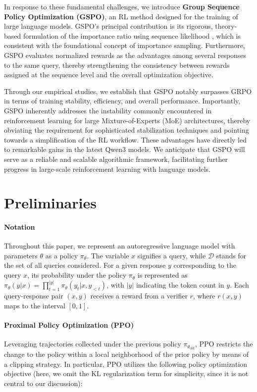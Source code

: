 In response to these fundamental challenges, we introduce \textbf{Group Sequence Policy Optimization (GSPO)}, an RL method designed for the training of large language models. GSPO's principal contribution is its rigorous, theory-based formulation of the importance ratio using sequence likelihood \citep{click}, which is consistent with the foundational concept of importance sampling. Furthermore, GSPO evaluates normalized rewards as the advantages among several responses to the same query, thereby strengthening the consistency between rewards assigned at the sequence level and the overall optimization objective.

Through our empirical studies, we establish that GSPO notably surpasses GRPO in terms of training stability, efficiency, and overall performance. Importantly, GSPO inherently addresses the instability commonly encountered in reinforcement learning for large Mixture-of-Experts (MoE) architectures, thereby obviating the requirement for sophisticated stabilization techniques and pointing towards a simplification of the RL workflow. These advantages have directly led to remarkable gains in the latest Qwen3 models. We anticipate that GSPO will serve as a reliable and scalable algorithmic framework, facilitating further progress in large-scale reinforcement learning with language models.

\section{Preliminaries}

\paragraph{Notation}
Throughout this paper, we represent an autoregressive language model with parameters $\theta$ as a policy $\pi_\theta$. The variable $x$ signifies a query, while $\mathcal{D}$ stands for the set of all queries considered. For a given response $y$ corresponding to the query $x$, its probability under the policy $\pi_\theta$ is represented as $\pi_\theta (y | x)=\prod_{t=1}^{|y|} \pi_\theta (y_t | x, y_{<t} )$, with $|y|$ indicating the token count in $y$. Each query-response pair $(x, y)$ receives a reward from a verifier $r$, where $r(x, y)$ maps to the interval $[ 0, 1 ]$.

\paragraph{Proximal Policy Optimization (PPO)} Leveraging trajectories collected under the previous policy $\pi_{\theta_\text{old}}$, PPO \citep{ppo} restricts the change to the policy within a local neighborhood of the prior policy by means of a clipping strategy. In particular, PPO utilizes the following policy optimization objective (here, we omit the KL regularization term for simplicity, since it is not central to our discussion):

